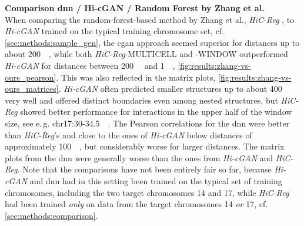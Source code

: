 \textbf{Comparison \acrshort{dnn} / Hi-cGAN / Random Forest by Zhang et al. }\\
When comparing the random-forest-based method by Zhang et al., \emph{HiC-Reg} \cite{Zhang2019}, 
to \emph{Hi-cGAN} trained on the typical training chromosome set, cf. \cref{sec:methods:sample_gen},
the \acrshort{cgan} approach seemed superior for distances up to about \SI{200}{\kilo\bp}, 
while both \emph{HiC-Reg}-MULTICELL and -WINDOW outperformed \emph{Hi-cGAN} for distances between 
\SI{200}{\kilo\bp} and \SI{1}{\mega\bp}, \cref{fig:results:zhang-vs-ours_pearson}.
This was also reflected in the matrix plots, \cref{fig:results:zhang-vs-ours_matrices}. 
\emph{Hi-cGAN} often predicted smaller structures up to about \SI{400}{\kilo\bp} very well and offered distinct boundaries
even among nested structures, but \emph{HiC-Reg} showed better performance for interactions in the upper half of the window size,
see e.\,g. chr17:30-\SI{34.5}{\mega\bp}.
The Pearson correlations for the \acrshort{dnn} were better than \emph{HiC-Reg}'s and close to the ones of \emph{Hi-cGAN} below distances of approximately 
\SI{100}{\kilo\bp}, but considerably worse for larger distances. 
The matrix plots from the \acrshort{dnn} were generally worse than the ones from \emph{Hi-cGAN} and \emph{HiC-Reg}.
Note that the comparisons have not been entirely fair so far, because \emph{Hi-cGAN} and \acrshort{dnn} had in this setting been
trained on the typical set of training chromosomes, including the two target chromosomes 14 and 17, 
while \emph{HiC-Reg} had been trained \emph{only} on data from the target chromosomes 14 \emph{or} 17, cf. \cref{sec:methods:comparison}.


